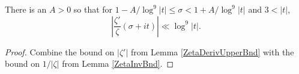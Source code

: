 \begin{lemma}[LogDerivZetaBnd]
\label{LogDerivZetaBnd}
\leanok
There is an $A>0$ so that for $1-A/\log^9 |t| \le \sigma < 1+A/\log^9 |t|$ and $3 < |t|$,
  $$
  |\frac {\zeta'}{\zeta} (\sigma+it)| \ll \log^9 |t|.
  $$
\end{lemma}
\begin{proof}
\leanok
Combine the bound on $|\zeta'|$ from Lemma \ref{ZetaDerivUpperBnd} with the
  bound on $1/|\zeta|$ from Lemma \ref{ZetaInvBnd}.
\end{proof}
